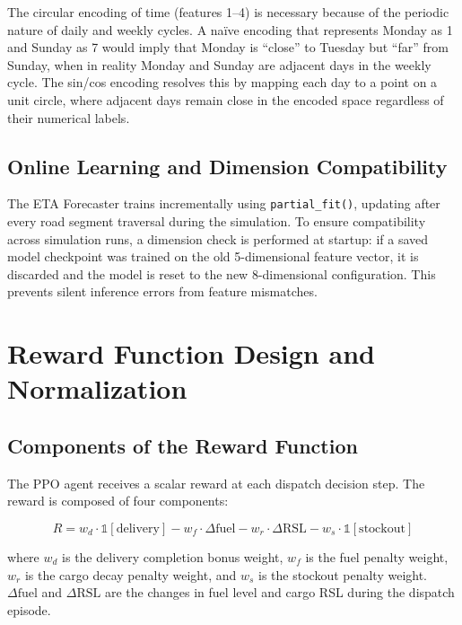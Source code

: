The circular encoding of time (features 1--4) is necessary because of the
periodic nature of daily and weekly cycles. A na{\"i}ve encoding that represents
Monday as 1 and Sunday as 7 would imply that Monday is ``close'' to Tuesday but
``far'' from Sunday, when in reality Monday and Sunday are adjacent days in the
weekly cycle. The sin/cos encoding resolves this by mapping each day to a point on
a unit circle, where adjacent days remain close in the encoded space regardless
of their numerical labels.

\subsection{Online Learning and Dimension Compatibility}

The ETA Forecaster trains incrementally using \texttt{partial\_fit()}, updating
after every road segment traversal during the simulation. To ensure compatibility
across simulation runs, a dimension check is performed at startup: if a saved
model checkpoint was trained on the old 5-dimensional feature vector, it is
discarded and the model is reset to the new 8-dimensional configuration. This
prevents silent inference errors from feature mismatches.

\section{Reward Function Design and Normalization}

\subsection{Components of the Reward Function}

The PPO agent receives a scalar reward at each dispatch decision step. The reward
is composed of four components:

\begin{equation}
    R = w_d \cdot \mathbb{1}[\text{delivery}] - w_f \cdot \Delta\text{fuel} - w_r \cdot \Delta\text{RSL} - w_s \cdot \mathbb{1}[\text{stockout}]
\end{equation}

where $w_d$ is the delivery completion bonus weight, $w_f$ is the fuel penalty
weight, $w_r$ is the cargo decay penalty weight, and $w_s$ is the stockout penalty
weight. $\Delta\text{fuel}$ and $\Delta\text{RSL}$ are the changes in fuel level
and cargo RSL during the dispatch episode.

